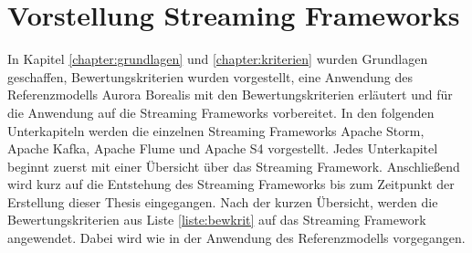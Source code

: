 \chapter{Vorstellung Streaming Frameworks}
\label{chapter:vorstellung}

In Kapitel \ref{chapter:grundlagen} und \ref{chapter:kriterien} wurden Grundlagen geschaffen, Bewertungskriterien wurden vorgestellt, eine Anwendung des Referenzmodells Aurora Borealis mit den Bewertungskriterien erläutert und für die Anwendung auf die Streaming Frameworks vorbereitet. In den folgenden Unterkapiteln werden die einzelnen Streaming Frameworks Apache Storm, Apache Kafka, Apache Flume und Apache S4 vorgestellt. Jedes Unterkapitel beginnt zuerst mit einer Übersicht über das Streaming Framework. Anschließend wird kurz auf die Entstehung des Streaming Frameworks bis zum Zeitpunkt der Erstellung dieser Thesis eingegangen. Nach der kurzen Übersicht, werden die Bewertungskriterien aus Liste \ref{liste:bewkrit} auf das Streaming Framework angewendet. Dabei wird wie in der Anwendung des Referenzmodells vorgegangen. 









